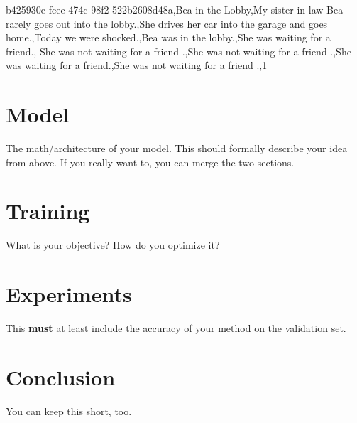\documentclass{article}
\begin{document}
b425930e-fcee-474c-98f2-522b2608d48a,Bea in the Lobby,My sister-in-law Bea rarely goes out into the lobby.,She drives her car into the garage and goes home.,Today we were shocked.,Bea was in the lobby.,She was waiting for a friend., She was not waiting for a friend .,She was not waiting for a friend .,She was waiting for a friend.,She was not waiting for a friend .,1


\section{Model}
The math/architecture of your model. This should formally describe your idea from above. If you really want to, you can merge the two sections.
\section{Training}
What is your objective? How do you optimize it?

\section{Experiments}
This {\bf must} at least include the accuracy of your method on the validation set.
\section{Conclusion}
You can keep this short, too.
\end{document}
